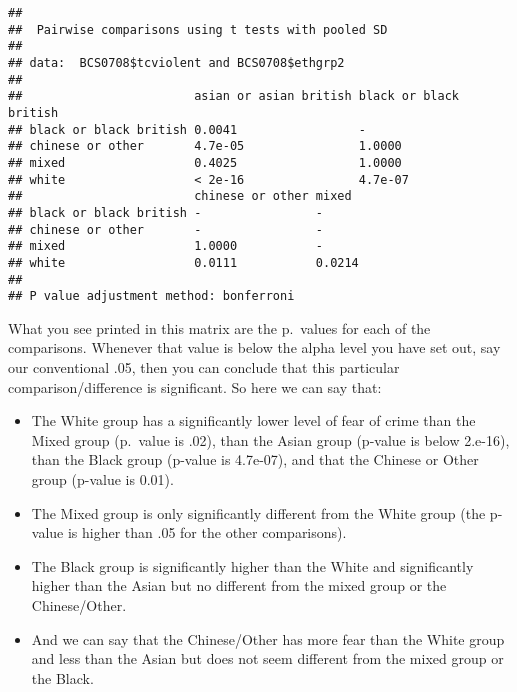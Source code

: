 \documentclass[
]{book}
\newenvironment{Shaded}{\begin{snugshade}}{\end{snugshade}}
\newcommand{\AttributeTok}[1]{\textcolor[rgb]{0.13,0.29,0.53}{#1}}
\newcommand{\FunctionTok}[1]{\textcolor[rgb]{0.13,0.29,0.53}{\textbf{#1}}}
\newcommand{\NormalTok}[1]{#1}
\newcommand{\SpecialCharTok}[1]{\textcolor[rgb]{0.81,0.36,0.00}{\textbf{#1}}}
\newcommand{\StringTok}[1]{\textcolor[rgb]{0.31,0.60,0.02}{#1}}
\begin{document}
\begin{Shaded}
\end{Shaded}

\begin{verbatim}
## 
##  Pairwise comparisons using t tests with pooled SD 
## 
## data:  BCS0708$tcviolent and BCS0708$ethgrp2 
## 
##                        asian or asian british black or black british
## black or black british 0.0041                 -                     
## chinese or other       4.7e-05                1.0000                
## mixed                  0.4025                 1.0000                
## white                  < 2e-16                4.7e-07               
##                        chinese or other mixed 
## black or black british -                -     
## chinese or other       -                -     
## mixed                  1.0000           -     
## white                  0.0111           0.0214
## 
## P value adjustment method: bonferroni
\end{verbatim}

What you see printed in this matrix are the p.~values for each of the comparisons. Whenever that value is below the alpha level you have set out, say our conventional .05, then you can conclude that this particular comparison/difference is significant. So here we can say that:

\begin{itemize}
\item
  The White group has a significantly lower level of fear of crime than the Mixed group (p.~value is .02), than the Asian group (p-value is below 2.e-16), than the Black group (p-value is 4.7e-07), and that the Chinese or Other group (p-value is 0.01).
\item
  The Mixed group is only significantly different from the White group (the p-value is higher than .05 for the other comparisons).
\item
  The Black group is significantly higher than the White and significantly higher than the Asian but no different from the mixed group or the Chinese/Other.
\item
  And we can say that the Chinese/Other has more fear than the White group and less than the Asian but does not seem different from the mixed group or the Black.
\end{itemize}
\end{document}
